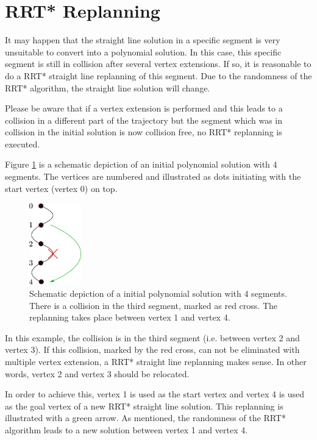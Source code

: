 \section{RRT* Replanning}\label{sec:replanningPassages}

It may happen that the straight line solution in a specific segment is very unsuitable to convert into a polynomial solution. In this case, this specific segment is still in collision after several vertex extensions. If so, it is reasonable to do a RRT* straight line replanning of this segment. Due to the randomness of the RRT* algorithm, the straight line solution will change. \newline

Please be aware that if a vertex extension is performed and this leads to a collision in a different part of the trajectory but the segment which was in collision in the initial solution is now collision free, no RRT* replanning is executed. \newline

Figure \ref{pic:vertexExtensionRRT} is a schematic depiction of an initial polynomial solution with 4 segments. The vertices are numbered and illustrated as dots initiating with the start vertex (vertex 0) on top. 
\begin{figure}[H]
   \centering
   \includegraphics[width=0.2\textwidth]{pics/vertexExtensionRRT2.eps}
   \caption{Schematic depiction of a initial polynomial solution with 4 segments. There is a collision in the third segment, marked as red cross. The replanning takes place between vertex 1 and vertex 4.}
   \label{pic:vertexExtensionRRT}
\end{figure}

In this example, the collision is in the third segment (i.e. between vertex 2 and vertex 3). If this collision, marked by the red cross, can not be eliminated with multiple vertex extension, a RRT* straight line replanning makes sense. In other words, vertex 2 and vertex 3 should be relocated. 

In order to achieve this, vertex 1 is used as the start vertex and vertex 4 is used as the goal vertex of a new RRT* straight line solution. This replanning is illustrated with a green arrow. As mentioned, the randomness of the RRT* algorithm leads to a new solution between vertex 1 and vertex 4.





